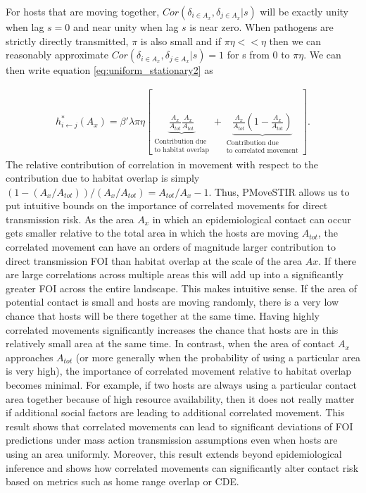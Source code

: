 \documentclass[letterpaper]{article}
\begin{document}
For hosts that are moving together, $Cor(\delta_{i \in A_x}, \delta_{j \in A_x} | s)$ will be exactly unity when lag $s = 0$ and near unity when lag $s$ is near zero. When pathogens are strictly directly transmitted, $\pi$ is also small and if $\pi \eta << \eta$ then we can reasonably approximate $Cor(\delta_{i \in A_x}, \delta_{j \in A_x} | s) = 1$ for s from 0 to $\pi \eta$.  We can then write equation \ref{eq:uniform_stationary2} as 

\begin{equation}
    \begin{aligned}
        h^*_{i \leftarrow j}(A_x) = \beta' \lambda \pi \eta \left[\underbrace{\frac{A_x}{A_{tot}}\frac{A_x}{A_{tot}}}_{\substack{\text{Contribution due} \\  \text{to habitat overlap}}} + \underbrace{\frac{A_x}{A_{tot}}(1 - \frac{A_x}{A_{tot}})}_{\substack{\text{Contribution due} \\ \text{to correlated movement}}} \right].
    \end{aligned}
    \label{eq:uniform_direct}
\end{equation}
The relative contribution of correlation in movement with respect to the contribution due to habitat overlap is simply $(1 - (A_x / A_{tot})) / (A_x / A_{tot})=A_{tot}/A_x-1$. 
Thus, PMoveSTIR allows us to put intuitive bounds on the importance of correlated movements for direct transmission risk. 
As the area $A_x$ in which an epidemiological contact can occur gets smaller relative to the total area in which the hosts are moving $A_{tot}$, the correlated movement can have an orders of magnitude larger contribution to direct transmission FOI than habitat overlap at the scale of the area $Ax$. If there are large  correlations across multiple areas this will add up into a significantly greater FOI across the entire landscape.
This makes intuitive sense. If the area of potential contact is small and hosts are moving randomly, there is a very low chance that hosts will be there together at the same time.  Having highly correlated movements significantly increases the chance that hosts are in this relatively small area at the same time.  
In contrast, when the area of contact $A_x$ approaches $A_{tot}$ (or more generally when the probability of using a particular area is very high), the importance of correlated movement relative to habitat overlap becomes minimal. For example, if two hosts are always using a particular contact area together because of high resource availability, then it does not really matter if additional social factors are leading to additional correlated movement. 
This result shows that correlated movements can lead to significant deviations of FOI predictions under mass action transmission assumptions even when hosts are using an area uniformly. Moreover, this result extends beyond epidemiological inference and shows how correlated movements can significantly alter contact risk based on metrics such as home range overlap or CDE.
\end{document}
